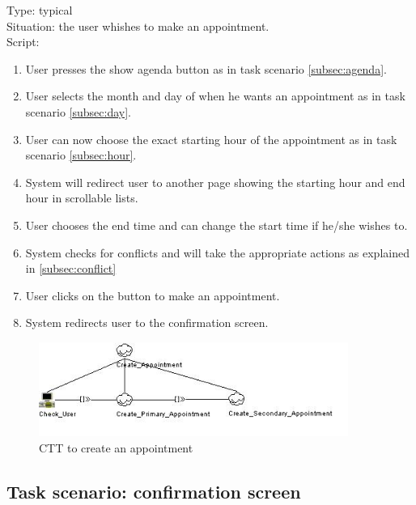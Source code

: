 \documentclass[11pt, a4paper,svglistings]{report}
\begin{document}
\label{subsec:appointment}Type: typical \\
Situation: the user whishes to make an appointment. \\
Script:
\begin{enumerate}
\item User presses the show agenda button as in task scenario \ref{subsec:agenda}.
\item User selects the month and day of when he wants an appointment as in task scenario \ref{subsec:day}.
\item User can now choose the exact starting hour of the appointment as in task scenario \ref{subsec:hour}.
\item System will redirect user to another page showing the starting hour and end hour in scrollable lists.
\item User chooses the end time and can change the start time if he/she wishes to.
\item System checks for conflicts and will take the appropriate actions as explained in \ref{subsec:conflict}
\item User clicks on the button to make an appointment.
\item System redirects user to the confirmation screen.
\end{enumerate}

\begin{figure}[H]
\centering
    \includegraphics[width=0.9\textwidth]{CreateAppointment.jpg}
  \caption[Create appointment CTT]{\label{fig:CreateAppointment}CTT to create an appointment}
\end{figure}

\subsection{Task scenario: confirmation screen}
\end{document}
